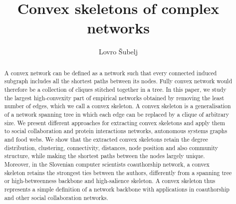 \documentclass[]{rsif}
\begin{document}
%
%

\title{Convex skeletons of complex networks}

\author{Lovro \v{S}ubelj}
\address{University of Ljubljana, Faculty of Computer and Information Science, Ljubljana, Slovenia}

\subject{mathematical physics}

%
%

\begin{abstract}
	A convex network can be defined as a network such that every connected induced subgraph includes all the shortest paths between its nodes. Fully convex network would therefore be a collection of cliques stitched together in a tree. In this paper, we study the largest high-convexity part of empirical networks obtained by removing the least number of edges, which we call a convex skeleton. A convex skeleton is a generalisation of a network spanning tree in which each edge can be replaced by a clique of arbitrary size. We present different approaches for extracting convex skeletons and apply them to social collaboration and protein interactions networks, autonomous systems graphs and food webs. We show that the extracted convex skeletons retain the degree distribution, clustering, connectivity, distances, node position and also community structure, while making the shortest paths between the nodes largely unique. Moreover, in the Slovenian computer scientists coauthorship network, a convex skeleton retains the strongest ties between the authors, differently from a spanning tree or high-betweenness backbone and high-salience skeleton. A convex skeleton thus represents a simple definition of a network backbone with applications in coauthorship and other social collaboration networks.
\end{abstract}

%
%
\end{document}

